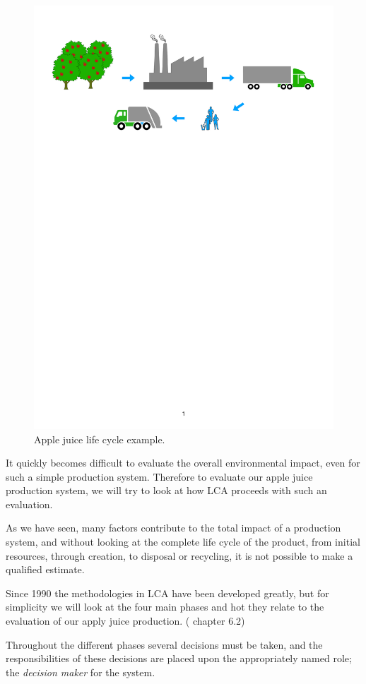 \begin{figure}[H]
    \centering
    \includegraphics[page=1, width=0.7\linewidth] {.Figures/AppleJuiceExample.pdf}
    \caption{Apple juice life cycle example.}
    \label{fig:lifecycleExample}
\end{figure}

It quickly becomes difficult to evaluate the overall environmental impact, even for such a simple production system. Therefore to evaluate our apple juice production system, we will try to look at how LCA proceeds with such an evaluation.

As we have seen, many factors contribute to the total impact of a production system, and without looking at the complete life cycle of the product, from initial resources, through creation, to disposal or recycling, it is not possible to make a qualified estimate.

Since 1990 the methodologies in LCA have been developed greatly, but for simplicity we will look at the four main phases and hot they relate to the evaluation of our apply juice production. (\cite{LCA_TheoryAndPractice} chapter 6.2)

Throughout the different phases several decisions must be taken, and the responsibilities of these decisions are placed upon the appropriately named role; the \emph{decision maker} for the system.

